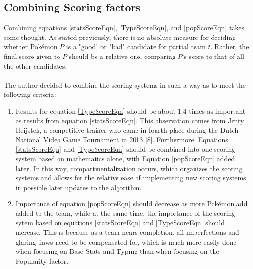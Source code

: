 \documentclass{article}
\begin{document}
\subsection{Combining Scoring factors}
Combining equations \ref{statsScoreEqn}, \ref{TypeScoreEqn}, and \ref{popScoreEqn} takes some thought. As stated previously, there is no absolute measure for deciding whether Pok\'emon $P$ is a "good" or "bad" candidate for partial team $t$. Rather, the final score given to $P$ should be a relative one, comparing $P$'s score to that of all the other candidates.\\\\
The author decided to combine the scoring systems in such a way as to meet the following criteria:
\begin{enumerate}
	\item Results for equation \ref{TypeScoreEqn} should be about 1.4 times as important as results from equation \ref{statsScoreEqn}. This observation comes from Jenty Heijstek, a competitive trainer who came in fourth place during the Dutch National Video Game Tournament in 2013 [8]. Furthermore, Equations \ref{statsScoreEqn} and \ref{TypeScoreEqn} should be combined into one scoring system based on mathematics alone, with Equation \ref{popScoreEqn} added later. In this way, compartmentalization occurs, which organizes the scoring systems and allows for the relative ease of implementing new scoring systems in possible later updates to the algorithm.
	\item Importance of equation \ref{popScoreEqn} should decrease as more Pok\'emon add added to the team, while at the same time, the importance of the scoring sytem based on equations \ref{statsScoreEqn} and \ref{TypeScoreEqn} should increase. This is because as a team nears completion, all imperfections and glaring flaws need to be compensated for, which is much more easily done when focusing on Base Stats and Typing than when focusing on the Popularity factor. 
\end{enumerate}
\end{document}
